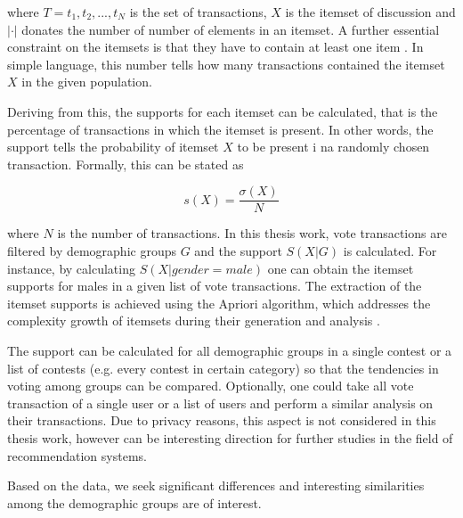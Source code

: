 where $T = {t_1, t_2, ..., t_N}$ is the set of transactions, $X$ is the itemset of discussion and $| \cdot |$ donates the number of number of elements in an itemset. A further essential constraint on the itemsets is that they have to contain at least one item \cite{introtodatamining}. In simple language, this number tells how many transactions contained the itemset $X$ in the given population.

Deriving from this, the supports for each itemset can be calculated, that is the percentage of transactions in which the itemset is present. In other words, the support tells the probability of itemset $X$ to be present i na randomly chosen transaction. Formally, this can be stated as 

\begin{equation}
    s(X) = \frac{\sigma (X)}{N}
\end{equation}

where $N$ is the number of transactions. In this thesis work, vote transactions are filtered by demographic groups $G$ and the support $S(X|G)$ is calculated. For instance, by calculating $S(X|gender = male)$ one can obtain the itemset supports for males in a given list of vote transactions. The extraction of the itemset supports is achieved using the Apriori algorithm, which addresses the complexity growth of itemsets during their generation and analysis \cite{introtodatamining}. 

The support can be calculated for all demographic groups in a single contest or a list of contests (e.g. every contest in certain category) so that the tendencies in voting among groups can be compared. Optionally, one could take all vote transaction of a single user or a list of users and perform a similar analysis on their transactions. Due to privacy reasons, this aspect is not considered in this thesis work, however can be interesting direction for further studies in the field of recommendation systems.

Based on the data, we seek significant differences and interesting similarities among the demographic groups are of interest. %



